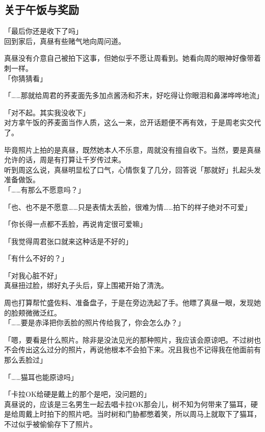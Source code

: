 \subsection{关于午饭与奖励}

「最后你还是收下了吗」\\

回到家后，真昼有些赌气地向周问道。

真昼没有介意自己被拍下这事，但她似乎不愿让周看到。她看向周的眼神好像带着刺一样。\\

「你猜猜看」

「……那就给周君的荞麦面先多加点酱汤和芥末，好吃得让你眼泪和鼻涕哗哗地流」

「对不起。其实我没收下」\\

对方拿午饭的荞麦面当作人质，这么一来，岔开话题便不再有效，于是周老实交代了。

毕竟照片上拍的是真昼，既然她本人不乐意，周就没有擅自收下。当然，要是真昼允许的话，周是有打算让千岁传过来。\\

听到周这么说，真昼明显松了口气，心情恢复了几分，回答说「那就好」扎起头发准备做饭。\\

「……有那么不愿意吗？」

「也、也不是不愿意……只是表情太丢脸，很难为情……拍下的样子绝对不可爱」

「你长得一点都不丢脸，再说肯定很可爱嘛」

「我觉得周君张口就来这种话是不好的」

「有什么不好的？」

「对我心脏不好」\\

真昼扭过脸，绑好丸子头后，穿上围裙开始了清洗。

周也打算帮忙盛佐料、准备盘子，于是在旁边洗起了手。他瞟了真昼一眼，发现她的脸颊微微泛红。\\

「……要是赤泽把你丢脸的照片传给我了，你会怎么办？」

「嗯，要看是什么照片。除非是没法见光的那种照片，我应该会原谅吧。不过树也不会传出这么过分的照片，再说他根本不会拍下来。况且我也不记得我在他面前有那么丢脸过」

「……猫耳也能原谅吗」

「卡拉OK给硬是戴上的那个是吧，没问题的」\\

真昼说的，应该是三名男生一起去唱卡拉OK那会儿，树不知为何带来了猫耳，硬是给周戴上时拍下的照片吧。当时树和门胁都憋着笑，所以周马上就取下了猫耳，不过似乎被偷偷存下了照片。\\


